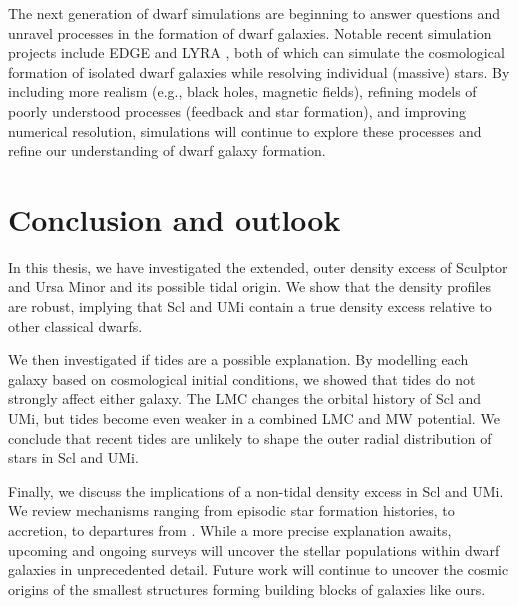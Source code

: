 The next generation of dwarf simulations are beginning to answer
questions and unravel processes in the formation of dwarf galaxies.
Notable recent simulation projects include EDGE \citep{agertz+2020} and
LYRA \citep{gutcke+2021}, both of which can simulate the cosmological
formation of isolated dwarf galaxies while resolving individual
(massive) stars. By including more realism (e.g., black holes, magnetic
fields), refining models of poorly understood processes (feedback and
star formation), and improving numerical resolution, simulations will
continue to explore these processes and refine our understanding of
dwarf galaxy formation.

\section{Conclusion and outlook}\label{conclusion-and-outlook}

In this thesis, we have investigated the extended, outer density excess
of Sculptor and Ursa Minor and its possible tidal origin. We show that
the density profiles are robust, implying that Scl and UMi contain a
true density excess relative to other classical dwarfs.

We then investigated if tides are a possible explanation. By modelling
each galaxy based on cosmological initial conditions, we showed that
tides do not strongly affect either galaxy. The LMC changes the orbital
history of Scl and UMi, but tides become even weaker in a combined LMC
and MW potential. We conclude that recent tides are unlikely to shape
the outer radial distribution of stars in Scl and UMi.

Finally, we discuss the implications of a non-tidal density excess in
Scl and UMi. We review mechanisms ranging from episodic star formation
histories, to accretion, to departures from \LCDM{}. While a more
precise explanation awaits, upcoming and ongoing surveys will uncover
the stellar populations within dwarf galaxies in unprecedented detail.
Future work will continue to uncover the cosmic origins of the smallest
structures forming building blocks of galaxies like ours.
